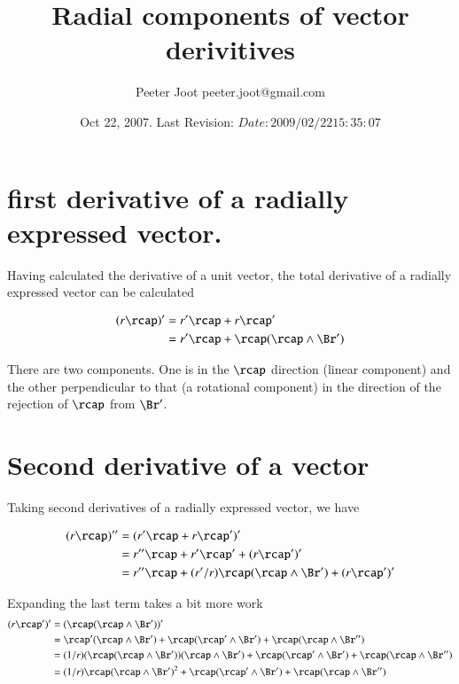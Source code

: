 \documentclass{article}      %
\title{Radial components of vector derivitives} %
\author{Peeter Joot \quad peeter.joot@gmail.com}         %
\date{ Oct 22, 2007.  Last Revision: $Date: 2009/02/22 15:35:07 $ }
\newcommand{\BrPrimeRej}[0]{\rcap(\rcap \wedge \Br')}
\begin{document}

\maketitle{}

\section{first derivative of a radially expressed vector.}

Having calculated the derivative of a unit vector, the total 
derivative of a radially expressed vector can be calculated

\begin{align*}
(r\rcap)'  
   &= r'\rcap  + r\rcap' \\
   &= r'\rcap  + \BrPrimeRej \\
\end{align*}

There are two components.  One is in the $\rcap$ direction (linear component)
and the other perpendicular to that (a rotational component) in the direction of the rejection
of $\rcap$ from $\Br'$.

\section{Second derivative of a vector}

Taking second derivatives of a radially expressed vector, we have

\begin{align*}
(r\rcap)'' 
   &= (r'\rcap + r{\rcap}')' \\
   &= r''\rcap + r'\rcap' + (r\rcap')' \\
   &= r''\rcap + (r'/r)\BrPrimeRej + (r\rcap')' \\
\end{align*}

Expanding the last term takes a bit more work
\begin{align*}
(r\rcap')' 
   &= (\BrPrimeRej)' \\
   &= 
\rcap'(\rcap \wedge \Br') +
\rcap(\rcap' \wedge \Br') +
\rcap(\rcap \wedge \Br'') \\
   &= 
(1/r)(\BrPrimeRej)(\rcap \wedge \Br') +
\rcap(\rcap' \wedge \Br') +
\rcap(\rcap \wedge \Br'') \\
   &= 
(1/r)\rcap(\rcap \wedge \Br')^2 +
\rcap(\rcap' \wedge \Br') +
\rcap(\rcap \wedge \Br'') \\
\end{align*}
\end{document}
